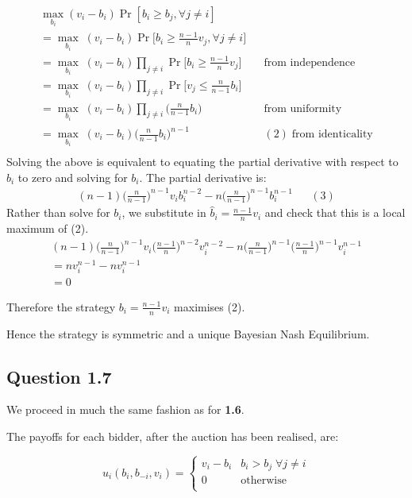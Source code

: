 \documentclass[11pt,a4paper]{article}
\begin{document}
\begin{align*}
\max_{b_i} (v_i-b_i) \Pr[b_i \geq b_j, \forall j \neq i] \\
= \max_{b_i} \;(v_i-b_i) \Pr\Big[b_i \geq \frac{n-1}{n}v_j, \forall j \neq i\Big] \\
= \max_{b_i} \;(v_i-b_i) \prod_{j \neq i} \Pr\Big[b_i \geq \frac{n-1}{n} v_j\Big] && \text{from independence}\\
= \max_{b_i} \;(v_i-b_i) \prod_{j \neq i} \Pr\Big[v_j \leq \frac{n}{n-1}b_i\Big] \\
= \max_{b_i} \;(v_i-b_i) \prod_{j \neq i} \Big(\frac{n}{n-1}b_i\Big) && \text{from uniformity}  \\
= \max_{b_i} \;(v_i-b_i) \Big(\frac{n}{n-1}b_i\Big)^{n-1} && (2) \; \text{from identicality}  \\
\end{align*}
Solving the above is equivalent to equating the partial derivative with respect to $b_i$ to zero and solving for $b_i$.
The partial derivative is:
\begin{align*}
(n-1)\Big(\frac{n}{n-1}\Big)^{n-1}v_i b_i^{n-2} - n\Big(\frac{n}{n-1}\Big)^{n-1}b_i^{n-1} && (3)
\end{align*}
Rather than solve for $b_i$, we substitute in $\hat{b}_i = \frac{n-1}{n}v_i$ and check that this is a local maximum of (2).
\begin{align*}
(n-1)\Big(\frac{n}{n-1}\Big)^{n-1}v_i\Big(\frac{n-1}{n}\Big)^{n-2}v_i^{n-2} - n\Big(\frac{n}{n-1}\Big)^{n-1}\Big(\frac{n-1}{n}\Big)^{n-1}v_i^{n-1} \\
= nv_i^{n-1} - nv_i^{n-1} \\
= 0 
\end{align*}

Therefore the strategy $b_i = \frac{n-1}{n}v_i$ maximises (2).

Hence the strategy is symmetric and a unique Bayesian Nash Equilibrium.

\subsection*{Question 1.7}

We proceed in much the same fashion as for \textbf{1.6}.

The payoffs for each bidder, after the auction has been realised, are:

$$u_i(b_i,b_{-i}, v_i) =  \begin{cases} 
      v_i-b_i & b_i>b_j \; \forall j \neq i \\
      0 & \text{otherwise} \\
   \end{cases}
$$
\end{document}
